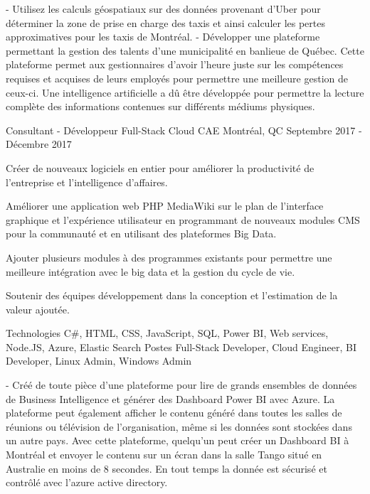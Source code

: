 \begin{cventries}
{\begin{cvitems}
\begin{cvsubentries}
			{
				- Utilisez les calculs géospatiaux sur des données provenant d’Uber pour déterminer la zone de prise en charge des taxis et ainsi calculer les pertes approximatives pour les taxis de Montréal.
			}
			{
				- Développer une plateforme permettant la gestion des talents d'une municipalité en banlieue de Québec. Cette plateforme permet aux gestionnaires d’avoir l’heure juste sur les compétences requises et acquises de leurs employés pour permettre une meilleure gestion de ceux-ci. Une intelligence artificielle a dû être développée pour permettre la lecture complète des informations contenues sur différents médiums physiques.
			}
		\end{cvsubentries}
      \end{cvitems}
    }

  \cventry
    {Consultant - Développeur Full-Stack Cloud}
    {CAE}
    {Montréal, QC}
    {Septembre 2017 - Décembre 2017}
    {
      \begin{cvitems}
        \item {Créer de nouveaux logiciels en entier pour améliorer la productivité de l’entreprise et l’intelligence d’affaires.}
        \item {Améliorer une application web PHP MediaWiki sur le plan de l’interface graphique et l’expérience utilisateur en programmant de nouveaux modules CMS pour la communauté et en utilisant des plateformes Big Data.}
		\item {Ajouter plusieurs modules à des programmes existants pour permettre une meilleure intégration avec le big data et la gestion du cycle de vie.}
		\item {Soutenir des équipes développement dans la conception et l'estimation de la valeur ajoutée.}
		\vspace{2mm}
        \begin{cvskills}
          \cvskill
          {Technologies}
    	  {C\#, HTML, CSS, JavaScript, SQL, Power BI, Web services, Node.JS, Azure, Elastic Search}
    	  \cvskill
          {Postes}
    	  {Full-Stack Developer, Cloud Engineer, BI Developer, Linux Admin, Windows Admin}
        \end{cvskills}
		\begin{cvsubentries}
		{
		    - Créé de toute pièce d'une plateforme pour lire de grands ensembles de données de Business Intelligence et générer des Dashboard Power BI avec Azure. La plateforme peut également afficher le contenu généré dans toutes les salles de réunions ou télévision de l’organisation, même si les données sont stockées dans un autre pays. Avec cette plateforme, quelqu’un peut créer un Dashboard BI à Montréal et envoyer le contenu sur un écran dans la salle Tango situé en Australie en moins de 8 secondes. En tout temps la donnée est sécurisé et contrôlé avec l’azure active directory.
}
\end{cvsubentries}
\end{cvitems}}
\end{cventries}
